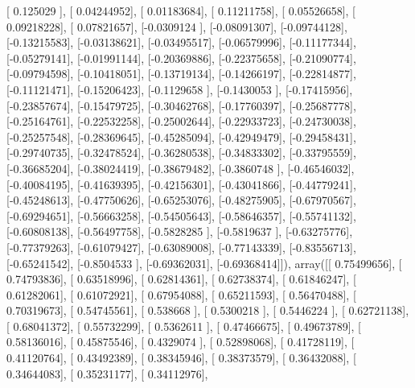 \documentclass{article}
\begin{document}
       [ 0.125029  ],
       [ 0.04244952],
       [ 0.01183684],
       [ 0.11211758],
       [ 0.05526658],
       [ 0.09218228],
       [ 0.07821657],
       [-0.0309124 ],
       [-0.08091307],
       [-0.09744128],
       [-0.13215583],
       [-0.03138621],
       [-0.03495517],
       [-0.06579996],
       [-0.11177344],
       [-0.05279141],
       [-0.01991144],
       [-0.20369886],
       [-0.22375658],
       [-0.21090774],
       [-0.09794598],
       [-0.10418051],
       [-0.13719134],
       [-0.14266197],
       [-0.22814877],
       [-0.11121471],
       [-0.15206423],
       [-0.1129658 ],
       [-0.1430053 ],
       [-0.17415956],
       [-0.23857674],
       [-0.15479725],
       [-0.30462768],
       [-0.17760397],
       [-0.25687778],
       [-0.25164761],
       [-0.22532258],
       [-0.25002644],
       [-0.22933723],
       [-0.24730038],
       [-0.25257548],
       [-0.28369645],
       [-0.45285094],
       [-0.42949479],
       [-0.29458431],
       [-0.29740735],
       [-0.32478524],
       [-0.36280538],
       [-0.34833302],
       [-0.33795559],
       [-0.36685204],
       [-0.38024419],
       [-0.38679482],
       [-0.3860748 ],
       [-0.46546032],
       [-0.40084195],
       [-0.41639395],
       [-0.42156301],
       [-0.43041866],
       [-0.44779241],
       [-0.45248613],
       [-0.47750626],
       [-0.65253076],
       [-0.48275905],
       [-0.67970567],
       [-0.69294651],
       [-0.56663258],
       [-0.54505643],
       [-0.58646357],
       [-0.55741132],
       [-0.60808138],
       [-0.56497758],
       [-0.5828285 ],
       [-0.5819637 ],
       [-0.63275776],
       [-0.77379263],
       [-0.61079427],
       [-0.63089008],
       [-0.77143339],
       [-0.83556713],
       [-0.65241542],
       [-0.8504533 ],
       [-0.69362031],
       [-0.69368414]]), array([[ 0.75499656],
       [ 0.74793836],
       [ 0.63518996],
       [ 0.62814361],
       [ 0.62738374],
       [ 0.61846247],
       [ 0.61282061],
       [ 0.61072921],
       [ 0.67954088],
       [ 0.65211593],
       [ 0.56470488],
       [ 0.70319673],
       [ 0.54745561],
       [ 0.538668  ],
       [ 0.5300218 ],
       [ 0.5446224 ],
       [ 0.62721138],
       [ 0.68041372],
       [ 0.55732299],
       [ 0.5362611 ],
       [ 0.47466675],
       [ 0.49673789],
       [ 0.58136016],
       [ 0.45875546],
       [ 0.4329074 ],
       [ 0.52898068],
       [ 0.41728119],
       [ 0.41120764],
       [ 0.43492389],
       [ 0.38345946],
       [ 0.38373579],
       [ 0.36432088],
       [ 0.34644083],
       [ 0.35231177],
       [ 0.34112976],
\end{document}
